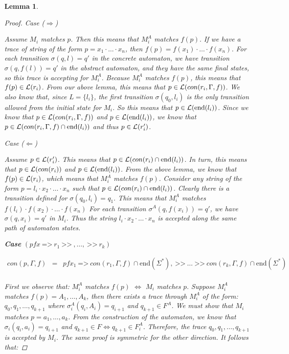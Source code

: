 \documentclass[twocolumn, openany]{sig-alternate-10pt}
\newcommand{\Prefer}{\texttt{>>}}
\newcommand{\Path}{\texttt{=>}}
\newtheorem{lem}[thm]{Lemma}
\begin{document}
\begin{lem}
\begin{proof}
    Case ($\Rightarrow$)

    Assume $M_i$ matches $p$. Then this means that $M^A_i$ matches $f(p)$. If we have a trace of string of the form $ p = x_1 \cdot \dots \cdot x_n$, then $f(p) = f(x_1) \cdot \dots \cdot f(x_n)$. For each transition $\sigma(q,l) = q'$ in the concrete automaton, we have transition $\sigma(q,f(l)) = q'$ in the abstract automaton, and they have the same final states, so this trace is accepting for $M^A_i$. Because $M^A_i$ matches $f(p)$, this means that $f(p) \in \mathcal{L}(r_i)$. From our above lemma, this means that $p \in \mathcal{L}(con(r_i,\Gamma,f))$. We also know that, since $L = \{ l_i \}$, the first transition $\sigma(q_0,l_i)$ is the only transition allowed from the initial state for $M_i$. So this means that $p \in \mathcal{L}(\text{end}(l_i))$. Since we know that $p \in \mathcal{L}(con(r_i,\Gamma,f))$ and $p \in \mathcal{L}(\text{end}(l_i))$, we know that $p \in \mathcal{L}(con(r_i,\Gamma,f) \cap \text{end}(l_i))$ and thus $p \in \mathcal{L}(r'_i)$.

    \vspace{1em}
    Case ($\Leftarrow$)

    Assume $p \in \mathcal{L}(r'_i)$. This means that $p \in \mathcal{L}(con(r_i) \cap \text{end}(l_i))$. In turn, this means that $p \in \mathcal{L}(con(r_i))$ and $p \in \mathcal{L}(\text{end}(l_i))$. From the above lemma, we know that $f(p) \in \mathcal{L}(r_i)$, which means that $M^A_i$ matches $f(p)$. 
    Consider any string of the form $p = l_i \cdot x_2 \cdot \dots \cdot x_n$ such that $p \in \mathcal{L}(con(r_i) \cap \text{end}(l_i))$. Clearly there is a transition defined for $\sigma(q_0,l_i) = q_1$.
    This means that $M^A_i$ matches $f(l_i) \cdot f(x_2) \cdot \dots \cdot f(x_n)$
    For each transition $\sigma^A(q,f(x_i)) = q'$, we have $\sigma(q,x_i) = q'$ in $M_i$.
    Thus the string $l_i \cdot x_2 \cdot \dots \cdot x_n$ is accepted along the same path of automaton states.

  \vspace{1em}

  \textbf{Case} $(pfx ~\Path~ r_1 ~\Prefer~,\dots, ~\Prefer~ r_k)$

    \[ \begin{array}{lcl}
      con(p,\Gamma,f) &=& pfx_1 ~\Path~ con(r_1,\Gamma,f) \cap \text{end}(\Sigma^*), ~\Prefer~ \dots ~\Prefer~ con(r_k,\Gamma,f) \cap \text{end}(\Sigma^*) \\
    \end{array} \]

    First we observe that: $M^A_i$ matches $f(p)$ $\iff$ $M_i$ matches $p$.
    Suppose $M^A_i$ matches $f(p) = A_1, \dots, A_k$, then there exists a trace through $M^A_i$ of the form:%
    $q_0, q_1, \dots, q_{k+1}$
    where $\sigma^A_i(q_i, A_i) = q_{i+1}$ and $q_{k+1} \in F^A$. We must show that $M_i$ matches $p = a_1, \dots, a_k$. %
    From the construction of the automaton, we know that $\sigma_i(q_i, a_i) = q_{i+1}$ and $q_{k+1} \in F \iff q_{k+1} \in F^A_i$. Therefore, the trace $q_0, q_1, \dots, q_{k+1}$ is accepted by $M_i$. 
    The same proof is symmetric for the other direction. It follows that:


\end{proof}
\end{lem}
\end{document}
